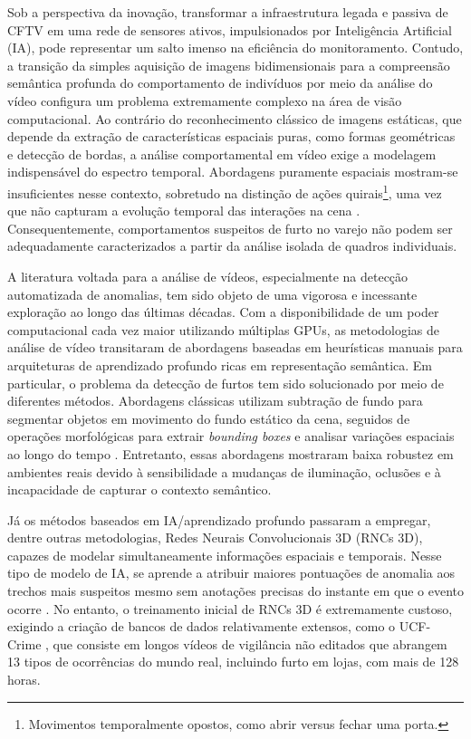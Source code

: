 \documentclass[12pt, %
openright, 
oneside, %
a4paper,    %
brazil]{facom-ufu-abntex2}
\begin{document}
Sob a perspectiva da inovação, transformar a infraestrutura legada e passiva de CFTV em uma rede de sensores ativos, impulsionados por Inteligência Artificial (IA), pode representar um salto imenso na eficiência do monitoramento. Contudo, a transição da simples aquisição de imagens bidimensionais para a compreensão semântica profunda do comportamento de indivíduos por meio da análise do vídeo configura um problema extremamente complexo na área de visão computacional. Ao contrário do reconhecimento clássico de imagens estáticas, que depende da extração de características espaciais puras, como formas geométricas e detecção de bordas, a análise comportamental em vídeo exige a modelagem indispensável do espectro temporal. Abordagens puramente espaciais mostram-se insuficientes nesse contexto, sobretudo na distinção de ações quirais\footnote{Movimentos temporalmente opostos, como abrir versus fechar uma porta.}, uma vez que não capturam a evolução temporal das interações na cena \cite{quiral}. Consequentemente, comportamentos suspeitos de furto no varejo não podem ser adequadamente caracterizados a partir da análise isolada de quadros individuais.

A literatura voltada para a análise de vídeos, especialmente na detecção automatizada de anomalias, tem sido objeto de uma vigorosa e incessante exploração ao longo das últimas décadas. Com a disponibilidade de um poder computacional cada vez maior utilizando múltiplas GPUs, as metodologias de análise de vídeo transitaram de abordagens baseadas em heurísticas manuais para arquiteturas de aprendizado profundo ricas em representação semântica. Em particular, o problema da detecção de furtos tem sido solucionado por meio de diferentes métodos. Abordagens clássicas utilizam subtração de fundo para segmentar objetos em movimento do fundo estático da cena, seguidos de operações morfológicas para extrair \textit{bounding boxes} e analisar variações espaciais ao longo do tempo \cite{Rahangdale,azevedo}. Entretanto, essas abordagens mostraram baixa robustez em ambientes reais devido à sensibilidade a mudanças de iluminação, oclusões e à incapacidade de capturar o contexto semântico.

Já os métodos baseados em IA/aprendizado profundo passaram a empregar, dentre outras metodologias, Redes Neurais Convolucionais 3D (RNCs 3D), capazes de modelar simultaneamente informações espaciais e temporais. Nesse tipo de modelo de IA, se aprende a atribuir maiores pontuações de anomalia aos trechos mais suspeitos mesmo sem anotações precisas do instante em que o evento ocorre \cite{sultani}. No entanto, o treinamento inicial de RNCs 3D é extremamente custoso, exigindo a criação de bancos de dados relativamente extensos, como o UCF-Crime \cite{sultani}, que consiste em longos vídeos de vigilância não editados que abrangem 13 tipos de ocorrências do mundo real, incluindo furto em lojas, com mais de 128 horas.
\end{document}
